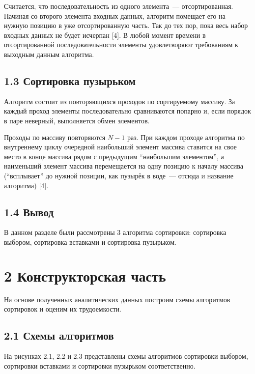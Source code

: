 \documentclass[12pt, a4paper]{report}
\begin{document}
Считается, что последовательность из одного элемента~--- отсортированная. Начиная со второго элемента входных данных, алгоритм помещает его на нужную позицию в уже отсортированную часть. Так до тех пор, пока весь набор входных данных не будет исчерпан [4]. В любой момент времени в отсортированной последовательности элементы удовлетворяют требованиям к выходным данным алгоритма.

\section*{1.3 Сортировка пузырьком}
Алгоритм состоит из повторяющихся проходов по сортируемому массиву.
За каждый проход элементы последовательно сравниваются попарно и, если порядок в паре неверный, выполняется обмен элементов.

Проходы по массиву повторяются $N-1$ раз. При каждом проходе алгоритма по внутреннему циклу очередной наибольший элемент массива ставится на свое место в конце массива рядом с предыдущим ``наибольшим элементом'', а наименьший элемент массива перемещается на одну позицию к началу массива (``всплывает'' до нужной позиции, как пузырёк в воде~--- отсюда и название алгоритма) [4].

\section*{1.4 Вывод}
В данном разделе были рассмотрены 3 алгоритма сортировки: сортировка выбором, сортировка вставками и сортировка пузырьком.

\newpage
\chapter*{2 Конструкторская часть}

На основе полученных аналитических данных построим схемы алгоритмов сортировок и оценим их трудоемкости.

\section*{2.1 Схемы алгоритмов}
На рисунках 2.1, 2.2 и 2.3 представлены схемы алгоритмов сортировки выбором, сортировки вставками и сортировки пузырьком соответственно.
\end{document}
